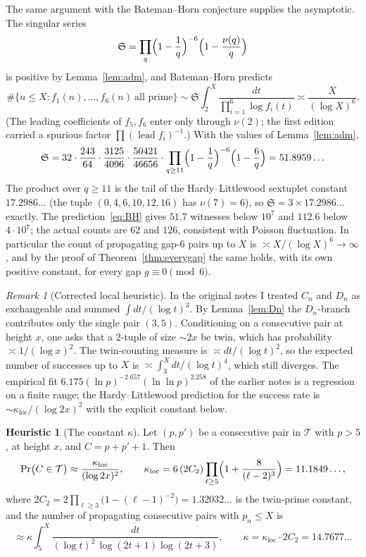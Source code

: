\documentclass[11pt,a4paper]{article}
\theoremstyle{definition}
\newtheorem{heuristic}[theorem]{Heuristic}
\theoremstyle{remark}
\newtheorem{remark}[theorem]{Remark}
\newcommand{\T}{\mathcal{T}}
\newcommand{\Sing}{\mathfrak{S}}
\begin{document}
The same argument with the Bateman--Horn conjecture \cite{BH} supplies the asymptotic.
The singular series
\begin{equation}\label{eq:S}
\Sing = \prod_q \Bigl(1-\frac1q\Bigr)^{-6}\Bigl(1-\frac{\nu(q)}q\Bigr)
\end{equation}
is positive by Lemma~\ref{lem:adm}, and Bateman--Horn predicts
\begin{equation}\label{eq:BH}
\#\{n\le X : f_1(n),\dots,f_6(n)\ \text{all prime}\} \sim \Sing\int_2^X \frac{dt}{\prod_{i=1}^6 \log f_i(t)} \asymp \frac{X}{(\log X)^6}.
\end{equation}
(The leading coefficients of $f_5, f_6$ enter only through $\nu(2)$; the first edition carried a spurious factor $\prod(\operatorname{lead} f_i)^{-1}$.)
With the values of Lemma~\ref{lem:adm},
\[
\Sing = 32\cdot\frac{243}{64}\cdot\frac{3125}{4096}\cdot\frac{50421}{46656}\cdot\prod_{q\ge 11}\Bigl(1-\frac1q\Bigr)^{-6}\Bigl(1-\frac6q\Bigr) = 51.8959\ldots
\]
The product over $q\ge 11$ is the tail of the Hardy--Littlewood sextuplet constant $17.2986\ldots$ (the tuple $(0,4,6,10,12,16)$ has $\nu(7)=6$), so $\Sing = 3\times 17.2986\ldots$ exactly.
The prediction~\eqref{eq:BH} gives $51.7$ witnesses below $10^7$ and $112.6$ below $4\cdot 10^7$; the actual counts are $62$ and $126$, consistent with Poisson fluctuation.
In particular the count of propagating gap-$6$ pairs up to $X$ is $\asymp X/(\log X)^6\to\infty$, and by the proof of Theorem~\ref{thm:everygap} the same holds, with its own positive constant, for every gap $g\equiv 0\pmod 6$.

\begin{remark}[Corrected local heuristic]\label{rem:heur}
In the original notes I treated $C_n$ and $D_n$ as exchangeable and summed $\int dt/(\log t)^3$.
By Lemma~\ref{lem:Dn} the $D_n$-branch contributes only the single pair $(3,5)$.
Conditioning on a consecutive pair at height $x$, one asks that a $2$-tuple of size $\sim 2x$ be twin, which has probability $\asymp 1/(\log x)^2$.
The twin-counting measure is $\asymp dt/(\log t)^2$, so the expected number of successes up to $X$ is $\asymp\int_3^X dt/(\log t)^4$, which still diverges.
The empirical fit $6.175(\ln p)^{-2.657}(\ln\ln p)^{2.258}$ of the earlier notes is a regression on a finite range; the Hardy--Littlewood prediction for the success rate is $\sim\kappa_{\mathrm{loc}}/(\log 2x)^2$ with the explicit constant below.
\end{remark}

\begin{heuristic}[The constant $\kappa$]\label{heur:kappa}
Let $(p,p')$ be a consecutive pair in $\T$ with $p>5$, at height $x$, and $C = p+p'+1$.
Then
\[
\Pr\bigl(C\in\T\bigr)\approx\frac{\kappa_{\mathrm{loc}}}{(\log 2x)^2},\qquad
\kappa_{\mathrm{loc}} = 6\,(2C_2)\prod_{\ell\ge 5}\Bigl(1+\frac{8}{(\ell-2)^3}\Bigr) = 11.1849\ldots,
\]
where $2C_2 = 2\prod_{\ell\ge 3}\bigl(1-(\ell-1)^{-2}\bigr) = 1.32032\ldots$ is the twin-prime constant, and the number of propagating consecutive pairs with $p_n\le X$ is
\[
\approx \kappa\int_5^X\frac{dt}{(\log t)^2\,\log(2t+1)\log(2t+3)},\qquad \kappa = \kappa_{\mathrm{loc}}\cdot 2C_2 = 14.7677\ldots
\]
\end{heuristic}
\end{document}
